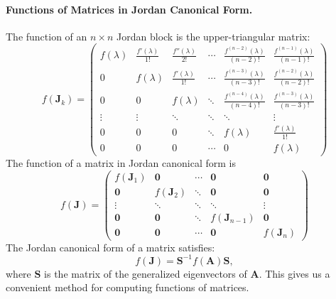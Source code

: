 


\paragraph{Functions of Matrices in Jordan Canonical Form.}
The function of an $n \times n$ Jordan block is the upper-triangular matrix:
\[
f(\mathbf{J}_k) = 
\begin{pmatrix}
  f(\lambda)& \frac{f'(\lambda)}{1!}& \frac{f''(\lambda)}{2!} &\cdots& 
  \frac{f^{(n-2)}(\lambda)}{(n-2)!}& \frac{f^{(n-1)}(\lambda)}{(n-1)!}\\
  0       &f(\lambda)& \frac{f'(\lambda)}{1!}&\cdots & 
  \frac{f^{(n-3)}(\lambda)}{(n-3)!}    & 
  \frac{f^{(n-2)}(\lambda)}{(n-2)!}\\
  0       & 0     &f(\lambda)&\ddots & \frac{f^{(n-4)}(\lambda)}{(n-4)!}        & 
  \frac{f^{(n-3)}(\lambda)}{(n-3)!}    \\
  \vdots      &\vdots     &\ddots &\ddots &\ddots &\vdots \\
  0       & 0     & 0     &\ddots     &f(\lambda)& \frac{f'(\lambda)}{1!}\\
  0       & 0     & 0     &\cdots     & 0     &f(\lambda)
\end{pmatrix}
\]
The function of a matrix in Jordan canonical form is
\[
f(\mathbf{J}) = 
\begin{pmatrix}
  f(\mathbf{J}_1)& \mathbf{0} &\cdots     & \mathbf{0}  & \mathbf{0} \\
  \mathbf{0}    &f(\mathbf{J}_2)&\ddots   & \mathbf{0}  & \mathbf{0} \\
  \vdots      &\ddots     &\ddots &\ddots &\vdots\\
  \mathbf{0}    & \mathbf{0}  &\ddots     & f(\mathbf{J}_{n-1})& \mathbf{0} \\
  \mathbf{0}    & \mathbf{0}  &\cdots     & \mathbf{0}  & f(\mathbf{J}_n)
\end{pmatrix}
\]
The Jordan canonical form of a matrix satisfies:
\[
f(\mathbf{J}) = \mathbf{S}^{-1} f(\mathbf{A}) \mathbf{S},
\]
where $\mathbf{S}$ is the matrix of the generalized eigenvectors of $\mathbf{A}$.
This gives us a convenient method for computing functions of matrices.





